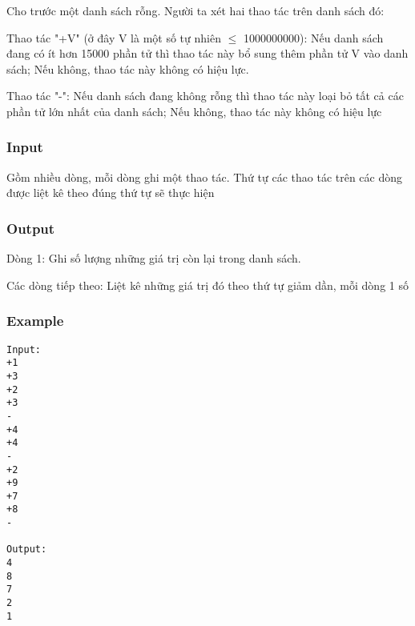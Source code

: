 



   Cho trước một danh sách rỗng. Người ta xét hai thao tác  trên danh sách đó:  

   Thao tác "+V" (ở đây V là một số tự nhiên  $\le$  1000000000): Nếu danh sách đang có ít hơn 15000 phần tử thì thao tác này bổ sung thêm phần tử V vào danh sách; Nếu không, thao tác này không có hiệu lực.  

   Thao tác "-": Nếu danh sách đang không rỗng thì thao tác này loại bỏ tất cả các phần tử lớn nhất của danh sách; Nếu không, thao tác này không có hiệu lực  

\subsubsection{   Input  }

   Gồm nhiều dòng, mỗi dòng ghi một thao tác. Thứ tự các thao tác trên các dòng được liệt kê theo đúng thứ tự sẽ thực hiện  

\subsubsection{   Output  }

   Dòng 1: Ghi số lượng những giá trị còn lại trong danh sách.  

   Các dòng tiếp theo: Liệt kê những giá trị đó theo thứ tự giảm dần, mỗi dòng 1 số  

\subsubsection{   Example  }
\begin{verbatim}
Input:
+1
+3
+2
+3
-
+4
+4
-
+2
+9
+7
+8
-

Output:
4
8 
7 
2 
1 

\end{verbatim}
